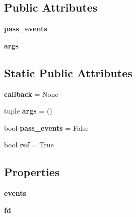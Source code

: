 \subsection*{Public Attributes}
\begin{DoxyCompactItemize}
\item 
\mbox{\label{classgevent_1_1libuv_1_1watcher_1_1io_1_1__multiplexwatcher_a6f0550bc2fbf099e7f42ef22aa4f171b}} 
{\bfseries pass\+\_\+events}
\item 
\mbox{\label{classgevent_1_1libuv_1_1watcher_1_1io_1_1__multiplexwatcher_aefc6185d1424e8ade3e977e9a97495c7}} 
{\bfseries args}
\end{DoxyCompactItemize}
\subsection*{Static Public Attributes}
\begin{DoxyCompactItemize}
\item 
\mbox{\label{classgevent_1_1libuv_1_1watcher_1_1io_1_1__multiplexwatcher_ac146292444fea40b2fe7fc338ff4d134}} 
{\bfseries callback} = None
\item 
\mbox{\label{classgevent_1_1libuv_1_1watcher_1_1io_1_1__multiplexwatcher_a6eaa19262597987f681d21163b950df7}} 
tuple {\bfseries args} = ()
\item 
\mbox{\label{classgevent_1_1libuv_1_1watcher_1_1io_1_1__multiplexwatcher_a20b12c51f1ee4bbca92dbbd819baad1d}} 
bool {\bfseries pass\+\_\+events} = False
\item 
\mbox{\label{classgevent_1_1libuv_1_1watcher_1_1io_1_1__multiplexwatcher_ac0311715b9371104e97fb2ed66a1f80d}} 
bool {\bfseries ref} = True
\end{DoxyCompactItemize}
\subsection*{Properties}
\begin{DoxyCompactItemize}
\item 
{\bfseries events}
\item 
{\bfseries fd}
\end{DoxyCompactItemize}


